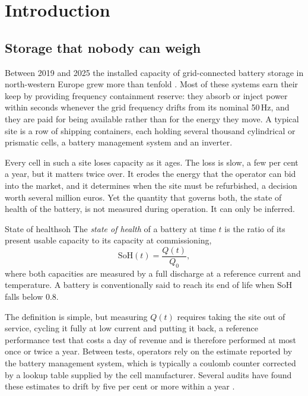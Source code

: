 \chapter{Introduction}
\label{ch:introduction}

\section{Storage that nobody can weigh}
\label{sec:weigh}

Between 2019 and 2025 the installed capacity of grid-connected battery
storage in north-western Europe grew more than tenfold
\parencite{iea2025storage}. Most of these systems earn their keep by
providing frequency containment reserve: they absorb or inject power
within seconds whenever the grid frequency drifts from its nominal
50\,Hz, and they are paid for being available rather than for the energy
they move. A typical site is a row of shipping containers, each holding
several thousand cylindrical or prismatic cells, a battery management
system and an inverter.

Every cell in such a site loses capacity as it ages. The loss is slow,
a few per cent a year, but it matters twice over. It erodes the energy
that the operator can bid into the market, and it determines when the
site must be refurbished, a decision worth several million euros. Yet
the quantity that governs both, the state of health of the battery, is
not measured during operation. It can only be inferred.

\begin{definition}{State of health}{soh}
  The \emph{state of health} of a battery at time \(t\) is the ratio of
  its present usable capacity to its capacity at commissioning,
  \begin{equation}
    \mathrm{SoH}(t) = \frac{Q(t)}{Q_0},
    \label{eq:soh}
  \end{equation}
  where both capacities are measured by a full discharge at a reference
  current and temperature. A battery is conventionally said to reach its
  end of life when \(\mathrm{SoH}\) falls below 0.8.
\end{definition}

The definition is simple, but measuring \(Q(t)\) requires taking the
site out of service, cycling it fully at low current and putting it back,
a reference performance test that costs a day of revenue and is therefore
performed at most once or twice a year. Between tests, operators rely on
the estimate reported by the battery management system, which is
typically a coulomb counter corrected by a lookup table supplied by the
cell manufacturer. Several audits have found these estimates to drift by
five per cent or more within a year \parencite{halvorsen2023bms}.

